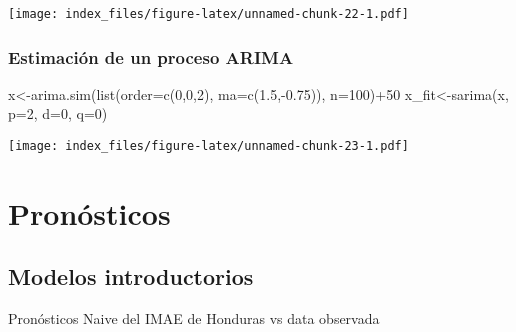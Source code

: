 \documentclass[
]{book}
\newenvironment{Shaded}{\begin{snugshade}}{\end{snugshade}}
\newcommand{\AttributeTok}[1]{\textcolor[rgb]{0.77,0.63,0.00}{#1}}
\newcommand{\DecValTok}[1]{\textcolor[rgb]{0.00,0.00,0.81}{#1}}
\newcommand{\FloatTok}[1]{\textcolor[rgb]{0.00,0.00,0.81}{#1}}
\newcommand{\FunctionTok}[1]{\textcolor[rgb]{0.00,0.00,0.00}{#1}}
\newcommand{\NormalTok}[1]{#1}
\newcommand{\OtherTok}[1]{\textcolor[rgb]{0.56,0.35,0.01}{#1}}
\newcommand{\SpecialCharTok}[1]{\textcolor[rgb]{0.00,0.00,0.00}{#1}}
\begin{document}
\texttt{[image: index\_files/figure-latex/unnamed-chunk-22-1.pdf]}

\hypertarget{estimaciuxf3n-de-un-proceso-arima}{%
\subsection{Estimación de un proceso ARIMA}\label{estimaciuxf3n-de-un-proceso-arima}}

\begin{Shaded}
\begin{Highlighting}[]
\NormalTok{x}\OtherTok{\textless{}{-}}\FunctionTok{arima.sim}\NormalTok{(}\FunctionTok{list}\NormalTok{(}\AttributeTok{order=}\FunctionTok{c}\NormalTok{(}\DecValTok{0}\NormalTok{,}\DecValTok{0}\NormalTok{,}\DecValTok{2}\NormalTok{), }\AttributeTok{ma=}\FunctionTok{c}\NormalTok{(}\FloatTok{1.5}\NormalTok{,}\SpecialCharTok{{-}}\FloatTok{0.75}\NormalTok{)), }\AttributeTok{n=}\DecValTok{100}\NormalTok{)}\SpecialCharTok{+}\DecValTok{50}
\NormalTok{x\_fit}\OtherTok{\textless{}{-}}\FunctionTok{sarima}\NormalTok{(x, }\AttributeTok{p=}\DecValTok{2}\NormalTok{, }\AttributeTok{d=}\DecValTok{0}\NormalTok{, }\AttributeTok{q=}\DecValTok{0}\NormalTok{)}
\end{Highlighting}
\end{Shaded}

\texttt{[image: index\_files/figure-latex/unnamed-chunk-23-1.pdf]}

\begin{Shaded}
\end{Shaded}

\hypertarget{pronuxf3sticos}{%
\chapter{Pronósticos}\label{pronuxf3sticos}}

\hypertarget{modelos-introductorios}{%
\section{Modelos introductorios}\label{modelos-introductorios}}

Pronósticos Naive del IMAE de Honduras vs data observada
\end{document}
